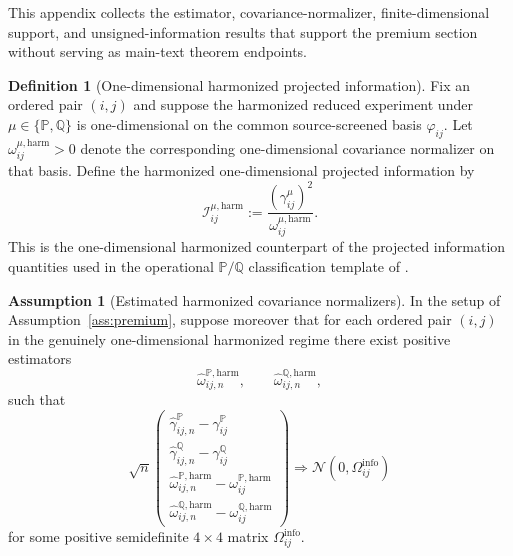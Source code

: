 \documentclass[11pt,a4paper]{amsart}
\theoremstyle{plain}
\theoremstyle{definition}
\newtheorem{definition}[theorem]{Definition}
\newtheorem{assumption}[theorem]{Assumption}
\theoremstyle{remark}
\newcommand{\PP}{\mathbb{P}}
\newcommand{\QQ}{\mathbb{Q}}
\begin{document}
This appendix collects the estimator, covariance-normalizer, finite-dimensional support, and
unsigned-information results that support the premium section without serving as main-text theorem
endpoints.

\begin{definition}[One-dimensional harmonized projected information]\label{def:premium-info}
Fix an ordered pair \((i,j)\) and suppose the harmonized reduced experiment under
\(\mu\in\{\PP,\QQ\}\) is one-dimensional on the common source-screened basis \(\varphi_{ij}\).  Let
\(\omega_{ij}^{\mu,\mathrm{harm}}>0\) denote the corresponding one-dimensional covariance
normalizer on that basis.  Define the harmonized one-dimensional projected information by
\[
        \mathcal I_{ij}^{\mu,\mathrm{harm}}
        :=
        \frac{(\gamma_{ij}^\mu)^2}{\omega_{ij}^{\mu,\mathrm{harm}}}.
\]
This is the one-dimensional harmonized counterpart of the projected information quantities used in
the operational \(\PP/\QQ\) classification template of \cite{vidal2026econometric}.
\end{definition}

\begin{assumption}[Estimated harmonized covariance normalizers]\label{ass:premium-info-est}
In the setup of Assumption~\ref{ass:premium}, suppose moreover that for each ordered pair
\((i,j)\) in the genuinely one-dimensional harmonized regime there exist positive estimators
\[
        \widehat\omega_{ij,n}^{\PP,\mathrm{harm}},
        \qquad
        \widehat\omega_{ij,n}^{\QQ,\mathrm{harm}},
\]
such that
\[
        \sqrt{n}
        \begin{pmatrix}
                \widehat\gamma_{ij,n}^\PP-\gamma_{ij}^\PP\\
                \widehat\gamma_{ij,n}^\QQ-\gamma_{ij}^\QQ\\
                \widehat\omega_{ij,n}^{\PP,\mathrm{harm}}-\omega_{ij}^{\PP,\mathrm{harm}}\\
                \widehat\omega_{ij,n}^{\QQ,\mathrm{harm}}-\omega_{ij}^{\QQ,\mathrm{harm}}
        \end{pmatrix}
        \Rightarrow
        \mathcal N(0,\Omega_{ij}^{\mathrm{info}})
\]
for some positive semidefinite \(4\times4\) matrix \(\Omega_{ij}^{\mathrm{info}}\).
\end{assumption}
\end{document}
